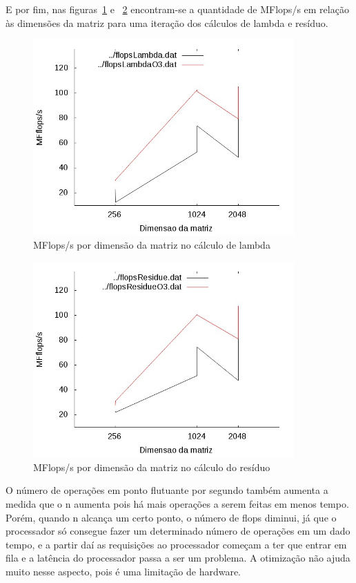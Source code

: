 \documentclass[12pt]{article}
\begin{document}
\clearpage

E por fim, nas figuras~\ref{fig:flopsLambda} e ~\ref{fig:flopsResidue}
encontram-se a quantidade de MFlops/s em relação às dimensões da matriz para
uma iteração dos cálculos de lambda e resíduo.

\begin{figure}[htb] \begin{center}
\includegraphics[width=100mm]{img/flopsLambda.jpg} \end{center}
\caption{MFlops/s por dimensão da matriz no cálculo de lambda}\label{fig:flopsLambda}
\end{figure}

\begin{figure}[htb] \begin{center}
\includegraphics[width=100mm]{img/flopsResidue.jpg} \end{center}
\caption{MFlops/s por dimensão da matriz no cálculo do resíduo}\label{fig:flopsResidue}
\end{figure}

O número de operações em ponto flutuante por segundo também aumenta a medida
que o n aumenta pois há mais operações a serem feitas em menos tempo. Porém,
quando n alcança um certo ponto, o número de flops diminui, já que o
processador só consegue fazer um determinado número de operações em um dado
tempo, e a partir daí as requisições ao processador começam a ter que entrar em
fila e a latência do processador passa a ser um problema. A otimização não
ajuda muito nesse aspecto, pois é uma limitação de hardware.
\end{document}
